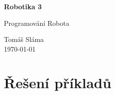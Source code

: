 \documentclass[11pt]{article}
\begin{document}
\begin{titlepage}
    \begin{center}
        \vspace*{1cm}
            
        \Huge
        \textbf{Robotika 3}
            
        \vspace{0.5cm}
        \LARGE
				Programování Robota
        
        \vspace{1.5cm}
        
        \vfill
        \flushright
        \normalsize
				Tomáš Sláma\\
				\today
        
    \end{center}
\end{titlepage}

\tableofcontents
\clearpage










\newpage
\setcounter{secnumdepth}{0}
\section{Řešení příkladů}
\setcounter{secnumdepth}{3}

\printsolutions
\end{document}
